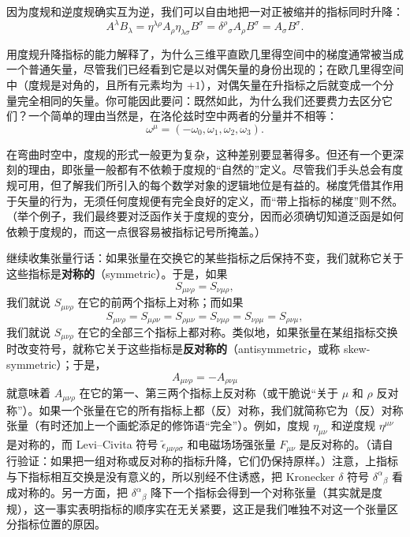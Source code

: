 因为度规和逆度规确实互为逆，我们可以自由地把一对正被缩并的指标同时升降：
\begin{equation*}
A^{\lambda}B_{\lambda} = \eta^{\lambda\rho}A_{\rho}\eta_{\lambda\sigma}B^{\sigma} = \delta^{\rho}{}_{\sigma}A_{\rho}B^{\sigma} = A_{\sigma}B^{\sigma}.
\tag{1.74}
\end{equation*}

用度规升降指标的能力解释了，为什么三维平直欧几里得空间中的梯度通常被当成一个普通矢量，尽管我们已经看到它是以对偶矢量的身份出现的；在欧几里得空间中（度规是对角的，且所有元素均为 $+1$），对偶矢量在升指标之后就变成一个分量完全相同的矢量。你可能因此要问：既然如此，为什么我们还要费力去区分它们？一个简单的理由当然是，在洛伦兹时空中两者的分量并不相等：
\begin{equation*}
\omega^{\mu} = (-\omega_{0}, \omega_{1}, \omega_{2}, \omega_{3}).
\tag{1.75}
\end{equation*}

在弯曲时空中，度规的形式一般更为复杂，这种差别要显著得多。但还有一个更深刻的理由，即张量一般都有不依赖于度规的“自然的”定义。尽管我们手头总会有度规可用，但了解我们所引入的每个数学对象的逻辑地位是有益的。梯度凭借其作用于矢量的行为，无须任何度规便有完全良好的定义，而“带上指标的梯度”则不然。（举个例子，我们最终要对泛函作关于度规的变分，因而必须确切知道泛函是如何依赖于度规的，而这一点很容易被指标记号所掩盖。）

继续收集张量行话：如果张量在交换它的某些指标之后保持不变，我们就称它关于这些指标是\textbf{对称的}（symmetric）。于是，如果
\begin{equation*}
S_{\mu\nu\rho} = S_{\nu\mu\rho},
\tag{1.76}
\end{equation*}
我们就说 $S_{\mu\nu\rho}$ 在它的前两个指标上对称；而如果
\begin{equation*}
S_{\mu\nu\rho} = S_{\mu\rho\nu} = S_{\rho\mu\nu} = S_{\nu\mu\rho} = S_{\nu\rho\mu} = S_{\rho\nu\mu},
\tag{1.77}
\end{equation*}
我们就说 $S_{\mu\nu\rho}$ 在它的全部三个指标上都对称。类似地，如果张量在某组指标交换时改变符号，就称它关于这些指标是\textbf{反对称的}（antisymmetric，或称 skew-symmetric）；于是，
\begin{equation*}
A_{\mu\nu\rho} = -A_{\rho\nu\mu}
\tag{1.78}
\end{equation*}
就意味着 $A_{\mu\nu\rho}$ 在它的第一、第三两个指标上反对称（或干脆说“关于 $\mu$ 和 $\rho$ 反对称”）。如果一个张量在它的所有指标上都（反）对称，我们就简称它为（反）对称张量（有时还加上一个画蛇添足的修饰语“完全”）。例如，度规 $\eta_{\mu\nu}$ 和逆度规 $\eta^{\mu\nu}$ 是对称的，而 Levi–Civita 符号 $\tilde{\epsilon}_{\mu\nu\rho\sigma}$ 和电磁场场强张量 $F_{\mu\nu}$ 是反对称的。（请自行验证：如果把一组对称或反对称的指标升降，它们仍保持原样。）注意，上指标与下指标相互交换是没有意义的，所以别经不住诱惑，把 Kronecker $\delta$ 符号 $\delta^{\alpha}{}_{\beta}$ 看成对称的。另一方面，把 $\delta^{\alpha}{}_{\beta}$ 降下一个指标会得到一个对称张量（其实就是度规），这一事实表明指标的顺序实在无关紧要，这正是我们唯独不对这一个张量区分指标位置的原因。

